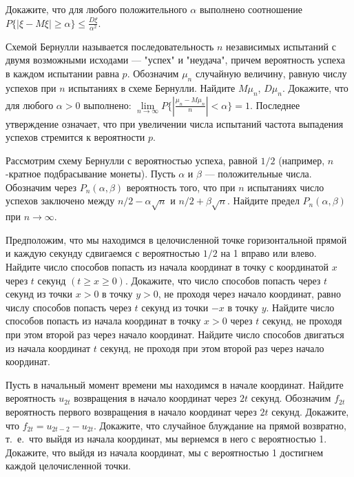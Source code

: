 \documentclass[a4paper,12pt]{article}
\begin{document}
Докажите, что  для любого положительного $\alpha $ выполнено соотношение
$P\{|\xi - M\xi|\ge \alpha\}\le \frac{D\xi}{\alpha ^2}$.

Схемой Бернулли называется последовательность $n$  независимых испытаний
с двумя возможными исходами --- "успех" и "неудача", причем вероятность
успеха в каждом испытании равна $p$. Обозначим $\mu _n$ случайную
величину, равную числу успехов при $n$ испытаниях в схеме Бернулли.
 Найдите $M\mu_n $, $D\mu_n $.
 Докажите, что для любого
$\alpha>0 $ выполнено:
$\lim\limits_{n\to\infty }P\{|\frac{\mu_n -M\mu_n}{n}|< \alpha\}=1$.
Последнее утверждение означает, что при увеличении числа испытаний частота
выпадения успехов стремится к вероятности $p$.

Рассмотрим схему Бернулли с вероятностью успеха, равной $1/2$ (например,
$n$-кратное подбрасывание монеты). Пусть $\alpha$ и $\beta$ --- положительные
числа. Обозначим через $P_n(\alpha, \beta)$ вероятность того, что при $n$
испытаниях число успехов заключено между $n/2-\alpha  \sqrt {n}$ и
$n/2+\beta  \sqrt {n}$. Найдите предел $P_n(\alpha, \beta)$ при
$n\to \infty$.

\newpage


Предположим, что мы находимся в целочисленной точке
горизонтальной прямой
 и каждую секунду сдвигаемся с вероятностью $1/2$
на 1 вправо или влево.
 Найдите число способов попасть из начала координат
в точку с координатой $x$ через
$t$ секунд $(t\ge x\ge 0)$.
 Докажите, что число способов попасть
через $t$ секунд из точки $x>0$
в точку $y>0$, не проходя через начало координат, равно числу способов
попасть через $t$ секунд из точки $-x$ в точку $y$.
 Найдите число способов попасть из начала координат в точку $ x>0$
через $t$ секунд, не проходя при этом второй раз через начало координат.
 Найдите число способов двигаться из начала координат $t$ секунд, не
проходя при этом второй раз через начало координат.

Пусть в начальный момент времени мы находимся в начале координат.
 Найдите вероятность $u_{2t}$ возвращения в начало координат через $2t$
секунд.
 Обозначим $f_{2t}$ вероятность первого возвращения в начало координат
через $2t$ секунд. Докажите, что $f_{2t}=u_{2t-2}-u_{2t}$.
 Докажите, что случайное блуждание на прямой возвратно,
т.~е.~что выйдя из
начала координат, мы вернемся в него с вероятностью 1.
 Докажите, что выйдя из начала координат, мы с вероятностью 1
достигнем каждой целочисленной точки.
\end{document}
